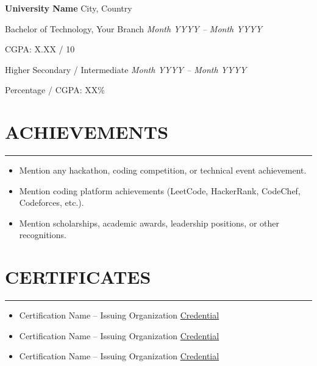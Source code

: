 \documentclass[a4paper,11pt]{article}
\newcommand{\ressection}[1]{\vspace{-2mm}\section*{\textbf{#1}}\vspace{-6mm}\noindent\rule{\textwidth}{0.1pt}}
\begin{document}
\noindent
\textbf{University Name} \hfill City, Country 

Bachelor of Technology, Your Branch \hfill \textit{Month YYYY -- Month YYYY} 

CGPA: X.XX / 10 


\vspace{4pt}

Higher Secondary / Intermediate \hfill \textit{Month YYYY -- Month YYYY} 

Percentage / CGPA: XX\%

\vspace{-10pt}


\ressection{ACHIEVEMENTS}

\vspace{-10pt}

\begin{itemize}[leftmargin=*]
\setlength{\itemsep}{-2pt}

\item Mention any hackathon, coding competition, or technical event achievement.

\item Mention coding platform achievements (LeetCode, HackerRank, CodeChef, Codeforces, etc.).

\item Mention scholarships, academic awards, leadership positions, or other recognitions.

\end{itemize}

\vspace{-10pt}


\ressection{CERTIFICATES}

\vspace{-10pt}

\begin{itemize}[leftmargin=*]
\setlength{\itemsep}{-2pt}

\item Certification Name -- Issuing Organization
\href{https://certificate-link.com}{Credential}

\item Certification Name -- Issuing Organization
\href{https://certificate-link.com}{Credential}

\item Certification Name -- Issuing Organization
\href{https://certificate-link.com}{Credential}

\end{itemize}
\end{document}
